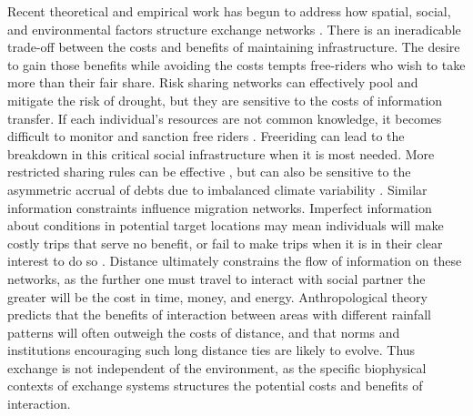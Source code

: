 \documentclass[fleqn,10pt]{wlscirep}
\begin{document}
Recent theoretical and empirical work has begun to address how spatial, social, and environmental factors structure exchange networks \cite{Nolin2010Food-SharingIndonesia,Koster2014,Hao2015,Schnegg2015}. 
There is an ineradicable trade-off between the costs and benefits of maintaining infrastructure. The desire to gain those benefits while avoiding the costs tempts free-riders who wish to take more than their fair share.
Risk sharing networks can effectively pool and mitigate the risk of drought, but they are sensitive to the costs of information transfer. If each individual's resources are not common knowledge, it becomes difficult to monitor and sanction free riders \cite{Hao2015a}. Freeriding can lead to the breakdown in this critical social infrastructure when it is most needed. More restricted sharing rules can be effective \cite{Hegmon1996}, but can also be sensitive to the asymmetric accrual of debts due to imbalanced climate variability \cite{Crabtree2015}. Similar information constraints influence migration networks. Imperfect information about conditions in potential target locations may mean individuals will make costly trips that serve no benefit, or fail to make trips when it is in their clear interest to do so \cite{Anderies2011a}. Distance ultimately constrains the flow of information on these networks, as the further one must travel to interact with social partner the greater will be the cost in time, money, and energy. Anthropological theory predicts that the benefits of interaction between areas with different rainfall patterns will often outweigh the costs of distance, and that norms and institutions encouraging such long distance ties are likely to evolve. Thus exchange is not independent of the environment, as the specific biophysical contexts of exchange systems structures the potential costs and benefits of interaction.
\end{document}
